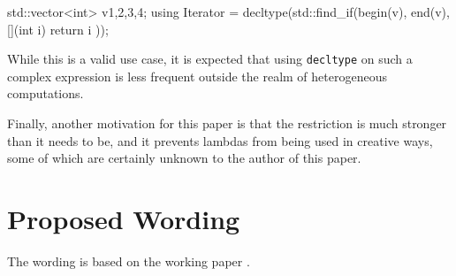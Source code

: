 \documentclass[11pt]{article}
\newcommand{\cc}[1]{\texttt{#1}}
\begin{document}
\begin{cpp}
std::vector<int> v{1,2,3,4};
using Iterator = decltype(std::find_if(begin(v), end(v), [](int i) {
  return i %
}));
\end{cpp}

While this is a valid use case, it is expected that using \cc{decltype} on
such a complex expression is less frequent outside the realm of heterogeneous
computations.

Finally, another motivation for this paper is that the restriction is much stronger
than it needs to be, and it prevents lambdas from being used in creative ways,
some of which are certainly unknown to the author of this paper.

\section{Proposed Wording}
The wording is based on the working paper \cite{N4606}.
\end{document}
